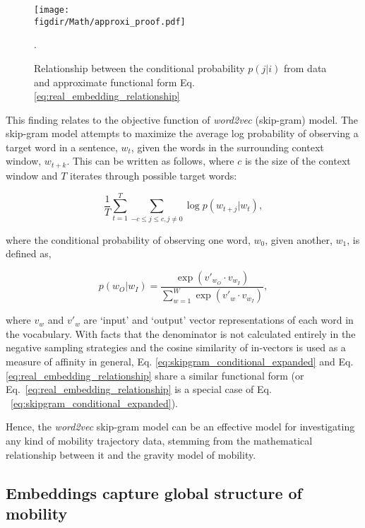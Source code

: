 \documentclass[12pt]{article} %
\def\figdir{../Figs}
\begin{document}
%
%
\begin{figure}
    \centering
    \texttt{[image: \\figdir/Math/approxi\_proof.pdf]}
    \caption{Relationship between the conditional probability $p(j|i)$ from data and approximate functional form Eq. \ref{eq:real_embedding_relationship}}.
    \label{fig:real_embedding_relationship}
\end{figure}

This finding relates to the objective function of \textit{word2vec} (skip-gram) model. The skip-gram model attempts to maximize the average log probability of observing a target word in a sentence, $w_{t}$, given the words in the surrounding context window, $w_{t + k}$. This can be written as follows, where $c$ is the size of the context window and $T$ iterates through possible target words:

\begin{equation}
    \label{eq:skipgram_log_prob_condensed}
    \frac{1}{T}\sum_{t=1}^{T} \sum_{-c \le j \le c, j \neq 0} \log p(w_{t+j}|w_t),  
\end{equation}

where the conditional probability of observing one word, $w_{0}$, given another, $w_{1}$, is defined as,

\begin{equation}
    \label{eq:skipgram_conditional_expanded}
    p(w_O|w_I) = \frac{\exp(v'_{w_O} \cdot v_{w_I})}{\sum_{w=1}^{W} \exp(v'_w \cdot v_{w_I})}, 
\end{equation}

where $v_w$ and $v'_w$ are `input' and `output' vector representations of each word in the vocabulary. With facts that the denominator is not calculated entirely in the negative sampling strategies and the cosine similarity of in-vectors is used as a measure of affinity in general, Eq. \ref{eq:skipgram_conditional_expanded} and Eq. \ref{eq:real_embedding_relationship} share a similar functional form (or Eq.~\ref{eq:real_embedding_relationship} is a special case of Eq. ~\ref{eq:skipgram_conditional_expanded}).

Hence, the \textit{word2vec} skip-gram model can be an effective model for investigating any kind of mobility trajectory data, stemming from the mathematical relationship between it and the gravity model of mobility. 


%
%
\subsection*{Embeddings capture global structure of mobility}
\end{document}
